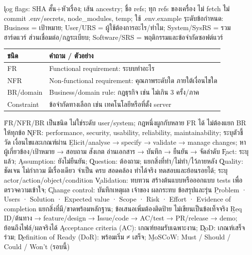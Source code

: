\k{log flags}:  SHA สั้น+หัวเรื่อง;  เส้น ancestry;  ชื่อ refs;  ทุก refs ของเครื่อง ไม่ fetch
\r{ไม่ commit .env/secrets, node\_modules, temp}; ใช้ .env.example
\k{ระดับข้อกำหนด}: Business = เป้าหมาย; User/URS = ผู้ใช้ต้องการอะไร/ทำไม; System/SysRS = รวมฮาร์ดแวร์ ส่วนเชื่อมต่อ/กฎระเบียบ; Software/SRS = พฤติกรรมและข้อจำกัดซอฟต์แวร์
{\smalltable\begin{tabularx}{\linewidth}{|p{8mm}|Y|}\hline
{}ชนิด & คำถาม / ตัวอย่าง\\\hline
FR & Functional requirement: ระบบทำอะไร\\\hline
NFR & Non-functional requirement: คุณภาพระดับใด ภายใต้เงื่อนไขใด\\\hline
BR/domain & Business/domain rule: กฎธุรกิจ เช่น ไม่เกิน 3 ครั้ง/ภาค\\\hline
Constraint & ข้อจำกัดทางเลือก เช่น เทคโนโลยีหรือที่ตั้ง server\\\hline
\end{tabularx}}
\r{FR/NFR/BR เป็นชนิด ไม่ใช่ระดับ user/system}; กฎหนึ่งผูกกับหลาย FR ได้ ไม่ต้องแยก BR ให้ทุกข้อ
\k{NFR}: performance, security, usability, reliability, maintainability; ระบุตัวชี้วัด เงื่อนไขและเกณฑ์ผ่าน
\b{Elicit/analyse → specify → validate → manage changes}; หาผู้เกี่ยวข้อง/เป้าหมาย → สอบถาม สังเกต อ่านเอกสาร → บันทึก → ยืนยัน → จัดลำดับ
\k{Fact}: ระบุแล้ว; \k{Assumption}: ยังไม่ยืนยัน; \k{Question}: ต้องถาม; แยกสิ่งที่ทำ/ไม่ทำ/ไว้ภายหลัง
\k{Quality}: ชัดเจน ไม่กำกวม มีเรื่องเดียว จำเป็น ครบ สอดคล้อง ทำได้จริง ทดสอบและย้อนรอยได้; ระบุ actor/action/object/condition
\k{Validation}: ทบทวน สร้างต้นแบบหรือออกแบบ tests เพื่อตรวจความเข้าใจ; \k{Change control}: บันทึกเหตุผล เจ้าของ ผลกระทบ ข้อสรุปและรุ่น
\b{Problem · Users · Solution · Expected value · Scope · Risk · Effort · Evidence of completion}
แยกสิ่งที่มี/ขาดพร้อมหลักฐาน; ข้อเสนอเพิ่มต้องติดป้าย ไม่เขียนเป็นข้อเท็จจริง
\b{Req ID/ต้นทาง → feature/design → Issue/code → AC/test → PR/release → demo}; ย้อนถึงไฟล์/ผลจริงได้
\k{Acceptance criteria (AC)}: เกณฑ์ยอมรับเฉพาะงาน; \k{DoD}: เกณฑ์เสร็จร่วม; \k{Definition of Ready (DoR)}: พร้อมเริ่ม ≠ เสร็จ; \b{MoSCoW}: Must / Should / Could / Won't (รอบนี้)

